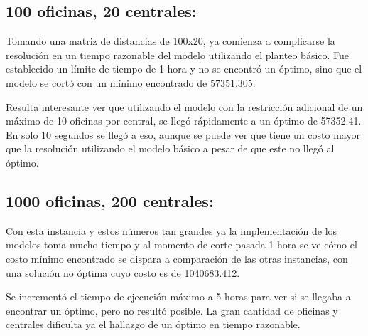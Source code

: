 \documentclass{article}
\begin{document}
\subsection*{100 oficinas, 20 centrales:}
Tomando una matriz de distancias de 100x20, ya comienza a complicarse la resolución en un tiempo razonable del modelo utilizando el planteo básico. Fue establecido un límite de tiempo de 1 hora y no se encontró un óptimo, sino que el modelo se cortó con un mínimo encontrado de 57351.305.

Resulta interesante ver que utilizando el modelo con la restricción adicional de un máximo de 10 oficinas por central, se llegó rápidamente a un óptimo de 57352.41. En solo 10 segundos se llegó a eso, aunque se puede ver que tiene un costo mayor que la resolución utilizando el modelo básico a pesar de que este no llegó al óptimo.

\subsection*{1000 oficinas, 200 centrales:}
Con esta instancia y estos números tan grandes ya la implementación de los modelos toma mucho tiempo y al momento de corte pasada 1 hora se ve cómo el costo mínimo encontrado se dispara a comparación de las otras instancias, con una solución no óptima cuyo costo es de 1040683.412.

Se incrementó el tiempo de ejecución máximo a 5 horas para ver si se llegaba a encontrar un óptimo, pero no resultó posible. La gran cantidad de oficinas y centrales dificulta ya el hallazgo de un óptimo en tiempo razonable.
\end{document}
